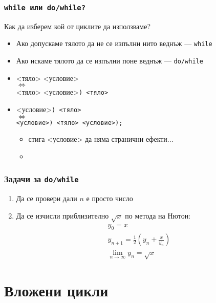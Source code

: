 \documentclass{beamer}
\begin{document}
\begin{frame}
  \frametitle{\tt{while} или \tt{do/while}?}

  Как да изберем кой от циклите да използваме?
  \begin{itemize}[<+->]
  \item Ако допускаме тялото да не се изпълни нито веднъж --- \tt{while}
  \item Ако искаме тялото да се изпълни поне веднъж --- \tt{do/while}
  \item {} <тяло> <условие>\lst{);}\\
    $\Leftrightarrow$\\
    <тяло> <условие>\tt) <тяло>
  \item {}<условие>\tt) <тяло>\\
    $\Leftrightarrow$\\
    <условие>\tt) <тяло> <условие>\tt{);}
    \begin{itemize}
    \item \alert{стига <условие> да няма странични ефекти...}
    \item \exa {}
    \end{itemize}
  \end{itemize}
\end{frame}

\begin{frame}
  \frametitle{Задачи за \tt{do/while}}

  \begin{enumerate}[<+->]
  \item Да се провери дали $n$ е просто число
  \item Да се изчисли приблизително $\sqrt x$ по метода на Нютон:
    \begin{equation*}
      \begin{array}{l}
      y_0 = x\\
      y_{n+1} = \frac12\left(y_n + \frac x{y_n}\right)\\
      \lim_{n\to\infty}\limits y_n = \sqrt x
      \end{array}
    \end{equation*}
  \end{enumerate}
\end{frame}

\section{Вложени цикли}
\end{document}
